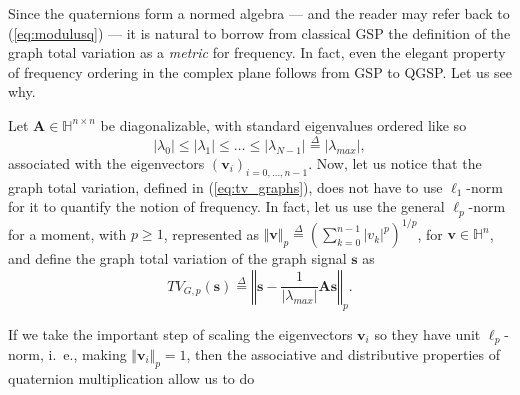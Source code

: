 Since the quaternions form a normed algebra --- and the reader may refer back to (\ref{eq:modulusq}) --- it is natural to borrow from classical GSP the definition of the graph total variation as a \textit{metric} for frequency. In fact, even the elegant property of frequency ordering in the complex plane follows from GSP to QGSP. Let us see why.

Let $ \mathbf{A} \in \mathbb{H}^{n \times n}$ be diagonalizable, with standard eigenvalues ordered like so
\begin{equation}
    \label{eq:eig_order_q}
    |\lambda_0| \leq |\lambda_1| \leq \dots \leq |\lambda_{N-1}| \overset{\Delta}{=} |\lambda_{max}|,
\end{equation}
associated with the eigenvectors $ (\mathbf{v}_i)_{i=0,\dots,n-1} $.
Now, let us notice that the graph total variation, defined in (\ref{eq:tv_graphs}), does not have to use $ \ell_1 $-norm for it to quantify the notion of frequency. In fact, let us use the general $ \ell_p $-norm for a moment, with $p \geq 1$, represented as $ \Vert \mathbf{v}\Vert_p \overset{\Delta}{=} \left(\sum_{k=0}^{n-1} |v_k|^p\right)^{1/p} $, for $\mathbf{v} \in \mathbb{H}^n$, and define the graph total variation of the graph signal $\mathbf{s}$ as
\begin{equation}
    \label{eq:tv_graphsq}
    TV_{G, p}(\mathbf{s}) \overset{\Delta}{=} \left\Vert \mathbf{s} - \frac{1}{|\lambda_{max}|}\mathbf{A} \mathbf{s} \right\Vert_p.
\end{equation}

If we take the important step of scaling the eigenvectors $\mathbf{v}_i$ so they have unit $\ell_p$-norm, i.~e., making $\Vert \mathbf{v}_i\Vert_p = 1$, then the associative and distributive properties of quaternion multiplication allow us to do

